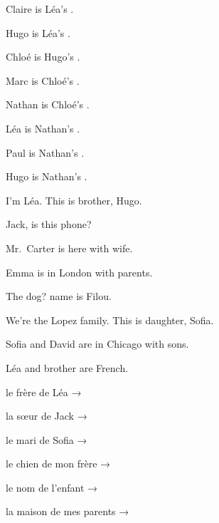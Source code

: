 \begin{center}\otArbreMartin\end{center}
\begin{questions}[2]
\item Claire is Léa's .
\item Hugo is Léa's .
\item Chloé is Hugo's .
\item Marc is Chloé's .
\item Nathan is Chloé's .
\item Léa is Nathan's .
\item Paul is Nathan's .
\item Hugo is Nathan's .
\end{questions}

\begin{questions}
\item I'm Léa. This is  brother, Hugo.
\item Jack, is this  phone?
\item Mr.\ Carter is here with  wife.
\item Emma is in London with  parents.
\item The dog?  name is Filou.
\item We're the Lopez family. This is  daughter, Sofia.
\item Sofia and David are in Chicago with  sons.
\item Léa and  brother are French.
\end{questions}

\begin{questions}[2]
\item le frère de Léa → 
\item la sœur de Jack → 
\item le mari de Sofia → 
\item le chien de mon frère → 
\item le nom de l'enfant → 
\item la maison de mes parents →\\ 
\end{questions}

